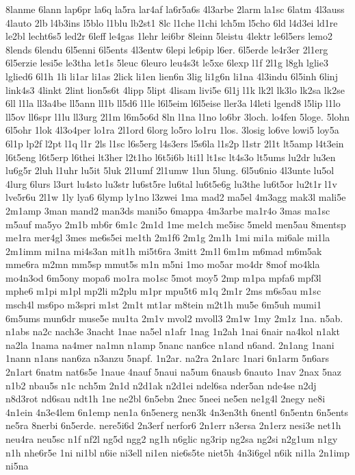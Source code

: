 {8lanme
6lann
lap6pr
la6q
la5ra
lar4af
la6r5a6s
4l3arbe
2larm
la1sc
6latm
4l3auss
4lauto
2lb
l4b3ins
l5blo
l1blu
lb2st1
8lc
l1che
l1chi
lch5m
l5cho
6ld
l4d3ei
ld1re
le2bl
lecht6s5
led2r
6leff
le4gas
1lehr
lei6br
8leinn
5leistu
4lektr
le6l5ers
lemo2
8lends
6lendu
6l5enni
6l5ents
4l3entw
6lepi
le6pip
l6er.
6l5erde
le4r3er
2l1erg
6l5erzie
lesi5e
le3tha
let1s
5leuc
6leuro
leu4s3t
le5xe
6lexp
l1f
2l1g
l8gh
lglie3
lglied6
6l1h
1li
li1ar
li1as
2lick
li1en
lien6n
3lig
li1g6n
li1na
4l3indu
6l5inh
6linj
link4s3
4linkt
2lint
lion5s6t
4lipp
5lipt
4lisam
livi5e
6l1j
l1k
lk2l
lk3lo
lk2sa
lk2se
6ll
l1la
ll3a4be
ll5ann
ll1b
ll5d6
l1le
l6l5eim
l6l5eise
ller3a
l4leti
lgend8
l5lip
l1lo
ll5ov
ll6spr
l1lu
ll3urg
2l1m
l6m5o6d
8ln
l1na
l1no
lo6br
3loch.
lo4fen
5loge.
5lohn
6l5ohr
1lok
4l3o4per
lo1ra
2l1ord
6lorg
lo5ro
lo1ru
1los.
3losig
lo6ve
lowi5
loy5a
6l1p
lp2f
l2pt
l1q
l1r
2ls
l1sc
l6s5erg
l4s3ers
l5s6la
l1s2p
l1str
2l1t
lt5amp
l4t3ein
l6t5eng
l6t5erp
l6thei
lt3her
l2t1ho
l6t5i6b
lti1l
lt1sc
lt4s3o
lt5ums
lu2dr
lu3en
lu6g5r
2luh
l1uhr
lu5it
5luk
2l1umf
2l1umw
1lun
5lung.
6l5u6nio
4l3unte
lu5ol
4lurg
6lurs
l3urt
lu4sto
lu3str
lu6st5re
lu6tal
lu6t5e6g
lu3the
lu6t5or
lu2t1r
l1v
lve5r6u
2l1w
1ly
lya6
6lymp
ly1no
l3zwei
1ma
mad2
ma5el
4m3agg
mak3l
mali5e
2m1amp
3man
mand2
man3ds
mani5o
6mappa
4m3arbe
ma1r4o
3mas
ma1sc
m5auf
ma5yo
2m1b
mb6r
6m1c
2m1d
1me
me1ch
me5isc
5meld
men5au
8mentsp
me1ra
mer4gl
3mes
me6s5ei
me1th
2m1f6
2m1g
2m1h
1mi
mi1a
mi6ale
mi1la
2m1imm
mi1na
mi4s3an
mit1h
mi5t6ra
3mitt
2m1l
6m1m
m6mad
m6m5ak
mme6ra
m2mn
mm5sp
mmut5s
m1n
m5ni
1mo
mo5ar
mo4dr
8mof
mo4kla
mo4n3od
6m5ony
mopa6
mo1ra
mo1sc
5mot
moy5
2mp
m1pa
mpfa6
mpf3l
mphe6
m1pi
m1pl
mp2li
m2plu
m1pr
mpu5t6
m1q
2m1r
2ms
m6s5au
m1sc
msch4l
ms6po
m3spri
m1st
2m1t
mt1ar
m8tein
m2t1h
mu5e
6m5uh
mumi1
6m5ums
mun6dr
muse5e
mu1ta
2m1v
mvol2
mvoll3
2m1w
1my
2m1z
1na.
n5ab.
n1abs
na2c
nach3e
3nacht
1nae
na5el
n1afr
1nag
1n2ah
1nai
6nair
na4kol
n1akt
na2la
1nama
na4mer
na1mn
n1amp
5nanc
nan6ce
n1and
n6and.
2n1ang
1nani
1nann
n1ans
nan6za
n3anzu
5napf.
1n2ar.
na2ra
2n1arc
1nari
6n1arm
5n6ars
2n1art
6natm
nat6s5e
1naue
4nauf
5naui
na5um
6nausb
6nauto
1nav
2nax
5naz
n1b2
nbau5s
n1c
nch5m
2n1d
n2d1ak
n2d1ei
ndel6sa
nder5an
nde4se
n2dj
n8d3rot
nd6sau
ndt1h
1ne
ne2bl
6n5ebn
2nec
5neei
ne5en
ne1g4l
2negy
ne8i
4n1ein
4n3e4lem
6n1emp
nen1a
6n5energ
nen3k
4n3en3th
6nentl
6n5entn
6n5ents
ne5ra
8nerbi
6n5erde.
nere5i6d
2n3erf
nerfor6
2n1err
n3ersa
2n1erz
nesi3e
net1h
neu4ra
neu5sc
n1f
nf2l
ng5d
ngg2
ng1h
n6glic
ng3rip
ng2sa
ng2si
n2g1um
n1gy
n1h
nhe6r5e
1ni
ni1bl
n6ie
ni3ell
ni1en
nie6s5te
niet5h
4n3i6gel
n6ik
ni1la
2n1imp
ni5na
}
